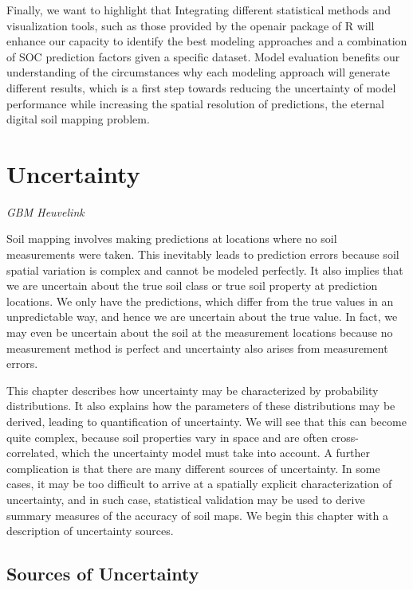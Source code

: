 \documentclass[10pt,b5paper,]{book}
\theoremstyle{definition}
\theoremstyle{definition}
\theoremstyle{definition}
\theoremstyle{remark}
\begin{document}
Finally, we want to highlight that Integrating different statistical
methods and visualization tools, such as those provided by the openair
package of R \citep{openair} will enhance our capacity to identify the
best modeling approaches and a combination of SOC prediction factors
given a specific dataset. Model evaluation benefits our understanding of
the circumstances why each modeling approach will generate different
results, which is a first step towards reducing the uncertainty of model
performance while increasing the spatial resolution of predictions, the
eternal digital soil mapping problem.

\hypertarget{uncertainty}{%
\chapter{Uncertainty}\label{uncertainty}}

\emph{GBM Heuvelink}

Soil mapping involves making predictions at locations where no soil
measurements were taken. This inevitably leads to prediction errors
because soil spatial variation is complex and cannot be modeled
perfectly. It also implies that we are uncertain about the true soil
class or true soil property at prediction locations. We only have the
predictions, which differ from the true values in an unpredictable way,
and hence we are uncertain about the true value. In fact, we may even be
uncertain about the soil at the measurement locations because no
measurement method is perfect and uncertainty also arises from
measurement errors.

This chapter describes how uncertainty may be characterized by
probability distributions. It also explains how the parameters of these
distributions may be derived, leading to quantification of uncertainty.
We will see that this can become quite complex, because soil properties
vary in space and are often cross-correlated, which the uncertainty
model must take into account. A further complication is that there are
many different sources of uncertainty. In some cases, it may be too
difficult to arrive at a spatially explicit characterization of
uncertainty, and in such case, statistical validation may be used to
derive summary measures of the accuracy of soil maps. We begin this
chapter with a description of uncertainty sources.

\hypertarget{sources-of-uncertainty}{%
\section{Sources of Uncertainty}\label{sources-of-uncertainty}}
\end{document}
